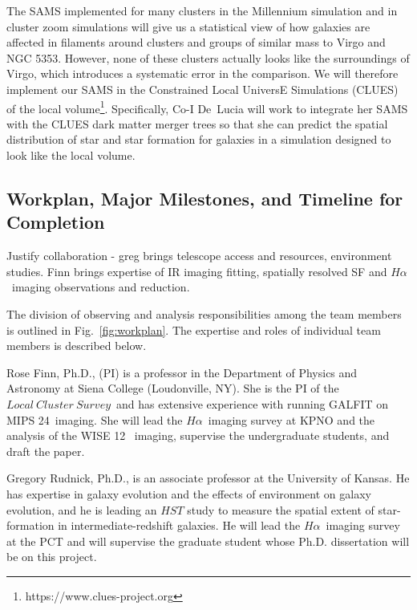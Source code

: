\documentclass[11pt, preprint]{aastex}
\newcommand{\ha}{$H\alpha$}
\newcommand{\lcs}{$Local \ Cluster \ Survey $}
\begin{document}
{%

The SAMS implemented for many clusters in the Millennium simulation and in cluster zoom simulations will give us a statistical view of how galaxies are affected in filaments around clusters and groups of similar mass to Virgo and NGC 5353.  However, none of these clusters actually looks like the surroundings of Virgo, which introduces a systematic error in the comparison.  We will therefore implement our SAMS in the Constrained Local UniversE Simulations (CLUES) of the local volume\footnote{https://www.clues-project.org}.   Specifically, Co-I De~Lucia will work to integrate her SAMS with the
CLUES  dark matter merger trees so that she can predict the spatial
distribution of star and star formation for galaxies in a simulation designed to look like the local volume.

\vspace*{-.9cm}\subsection{Workplan, Major Milestones, and Timeline for Completion }
\vspace*{-.3cm}

Justify collaboration - greg brings telescope access and resources,
environment studies.  Finn brings expertise of IR imaging fitting, spatially resolved SF
and \ha \ imaging observations and reduction.

The division of observing and analysis responsibilities among the team
members is outlined in Fig.~\ref{fig:workplan}.   The expertise and
roles of individual team members is described below.

Rose Finn, Ph.D., (PI) is a professor in the Department of Physics
and Astronomy at Siena College (Loudonville, NY).  She is the PI of
the \lcs \ and has extensive experience with running GALFIT on MIPS
24\micron \ imaging.  She will lead the \ha \ imaging survey at KPNO
and the analysis of the WISE 12\micron
\ imaging, supervise the undergraduate students, and draft the paper.

Gregory Rudnick, Ph.D., is an associate professor at the University of
Kansas.  He has expertise in galaxy evolution and the effects of environment on galaxy evolution, and he is leading an
$HST$ study to measure the spatial extent of star-formation in
intermediate-redshift galaxies.  He will lead the \ha \ imaging survey
at the PCT and will supervise the graduate student whose Ph.D. dissertation will be on this project.

}
\end{document}
